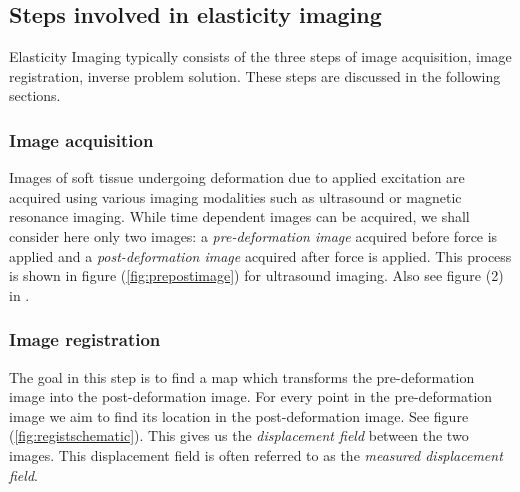 \documentclass[12pt]{article}
\begin{document}
\subsection{Steps involved in elasticity imaging}
Elasticity Imaging typically consists of the three steps of image acquisition, image registration, inverse problem solution. These steps are discussed in the following sections.
\subsubsection{Image acquisition} Images of soft tissue undergoing deformation due to applied excitation are acquired using various imaging modalities such as ultrasound or magnetic resonance imaging. While time dependent images can be acquired, we shall consider here only two images: a \textit{pre-deformation image} acquired before force is applied and a \textit{post-deformation image} acquired after force is applied. This process is shown in figure (\ref{fig:prepostimage}) for ultrasound imaging. Also see figure (2) in \cite{paper:konofagou2004}.
\subsubsection{Image registration} The goal in this step is to find a map which transforms the pre-deformation image into the post-deformation image. For every point in the pre-deformation image we aim to find its location in the post-deformation image. See figure (\ref{fig:registschematic}). This gives us the \textit{displacement field} between the two images. This displacement field is often referred to as the \textit{measured displacement field}.
\end{document}
